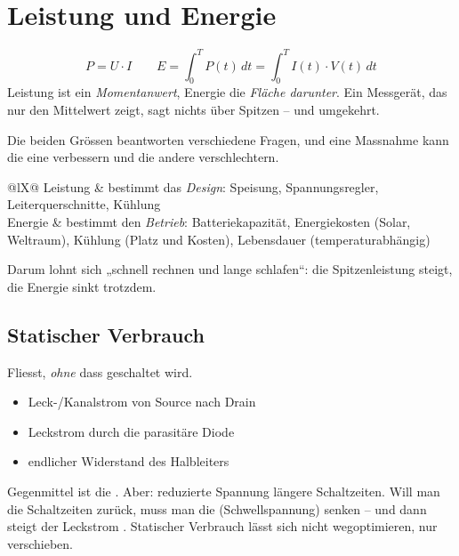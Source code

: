 \section{Leistung und Energie}
\label{sec:pwr}

\begin{formel}
\[ P = U \cdot I \qquad
   E = \int_0^T P(t)\,dt = \int_0^T I(t) \cdot V(t)\,dt \]
\merkzeile Leistung ist ein \emph{Momentanwert}, Energie die
\emph{Fläche darunter}. Ein Messgerät, das nur den Mittelwert zeigt,
sagt nichts über Spitzen -- und umgekehrt.
\end{formel}

 Die beiden Grössen beantworten
verschiedene Fragen, und eine Massnahme kann die eine verbessern und die
andere verschlechtern.
\begin{ztab}{@{}lX@{}}
Leistung & bestimmt das \emph{Design}: Speisung, Spannungsregler,
  Leiterquerschnitte, Kühlung \\
Energie & bestimmt den \emph{Betrieb}: Batteriekapazität, Energiekosten
  (Solar, Weltraum), Kühlung (Platz und Kosten), Lebensdauer
  (temperaturabhängig) \\
\end{ztab}
\merkzeile Darum lohnt sich „schnell rechnen und lange schlafen“: die
Spitzenleistung steigt, die Energie sinkt trotzdem.

\subsection{Statischer Verbrauch}
\label{sec:statisch}
Fliesst, \emph{ohne} dass geschaltet wird.
\begin{itemize}
\item Leck-/Kanalstrom von Source nach Drain
\item Leckstrom durch die parasitäre Diode
\item endlicher Widerstand des Halbleiters
\end{itemize}
\begin{falle}
Gegenmittel ist die . Aber: reduzierte
Spannung \ra längere Schaltzeiten. Will man die Schaltzeiten zurück,
muss man die  (Schwellspannung) senken -- und dann
steigt der Leckstrom . Statischer Verbrauch lässt sich
nicht wegoptimieren, nur verschieben.
\end{falle}

